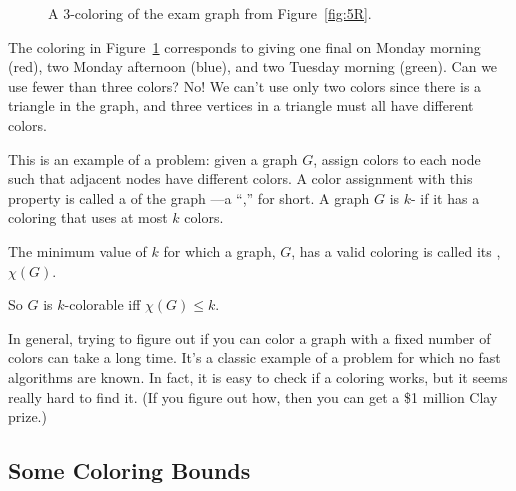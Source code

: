 \begin{figure}


\caption{A 3-coloring of the exam graph from Figure~\ref{fig:5R}.}

\label{fig:5S}

\end{figure}

The coloring in Figure~\ref{fig:5S} corresponds to giving one final on
Monday morning (red), two Monday afternoon (blue), and two Tuesday
morning (green).  Can we use fewer than three colors?  No! We can't
use only two colors since there is a triangle in the graph, and three
vertices in a triangle must all have different colors.

This is an example of a  problem:
 given a graph $G$, assign colors to each
node such that adjacent nodes have different colors.  A color assignment
with this property is called a   of the graph ---a ``,'' for short.  A graph $G$
is $k$- if it has a coloring that uses at most $k$ colors.
\begin{definition}
  The minimum value of $k$ for which a graph, $G$, has a valid coloring is
  called its , $\chi(G)$.
\end{definition}
\begin{editingnotes}
\end{editingnotes}
So $G$ is $k$-colorable iff $\chi(G) \leq k$.

In general, trying to figure out if you can color a graph with a fixed
number of colors can take a long time.  It's a classic example of a
problem for which no fast algorithms are known.  In fact, it is easy to
check if a coloring works, but it seems really hard to find it. (If you
figure out how, then you can get a \$1 million Clay prize.)


\subsection{Some Coloring Bounds}

